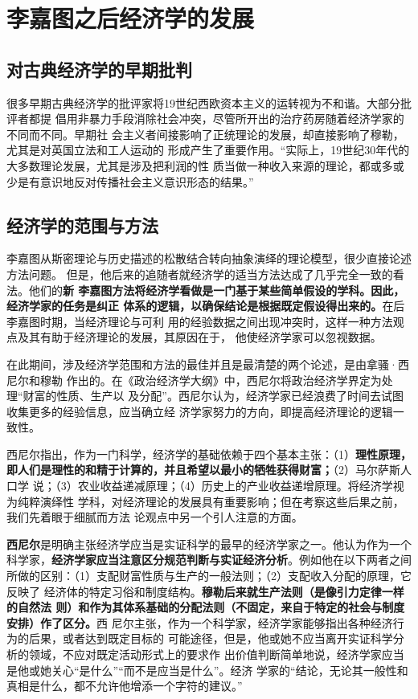 \section{李嘉图之后经济学的发展}

\subsection{对古典经济学的早期批判}

很多早期古典经济学的批评家将19世纪西欧资本主义的运转视为不和谐。大部分批评者都提
倡用非暴力手段消除社会冲突，尽管所开出的治疗药房随着经济学家的不同而不同。早期社
会主义者间接影响了正统理论的发展，却直接影响了穆勒，尤其是对英国立法和工人运动的
形成产生了重要作用。“实际上，19世纪30年代的大多数理论发展，尤其是涉及把利润的性
质当做一种收入来源的理论，都或多或少是有意识地反对传播社会主义意识形态的结果。”

\subsection{经济学的范围与方法}

李嘉图从斯密理论与历史描述的松散结合转向抽象演绎的理论模型，很少直接论述方法问题。
但是，他后来的追随者就经济学的适当方法达成了几乎完全一致的看法。他们的\textbf{新
  李嘉图方法将经济学看做是一门基于某些简单假设的学科。因此，经济学家的任务是纠正
  体系的逻辑，以确保结论是根据既定假设得出来的。}在后李嘉图时期，当经济理论与可利
用的经验数据之间出现冲突时，这样一种方法观点及其有助于经济理论的发展，其原因在于，
他使经济学家可以忽视数据。

在此期间，涉及经济学范围和方法的最佳并且是最清楚的两个论述，是由拿骚·西尼尔和穆勒
作出的。在《政治经济学大纲》中，西尼尔将政治经济学界定为处理“财富的性质、生产以
及分配”。西尼尔认为，经济学家已经浪费了时间去试图收集更多的经验信息，应当确立经
济学家努力的方向，即提高经济理论的逻辑一致性。

西尼尔指出，作为一门科学，经济学的基础依赖于四个基本主张：（1）\textbf{理性原理，
  即人们是理性的和精于计算的，并且希望以最小的牺牲获得财富；}（2）马尔萨斯人口学
说；（3）农业收益递减原理；（4）历史上的产业收益递增原理。将经济学视为纯粹演绎性
学科，对经济理论的发展具有重要影响；但在考察这些后果之前，我们先着眼于细腻而方法
论观点中另一个引人注意的方面。

\textbf{西尼尔}是明确主张经济学应当是实证科学的最早的经济学家之一。他认为作为一个
科学家，\textbf{经济学家应当注意区分规范判断与实证经济分析}。例如他在以下两者之间
所做的区别：（1）支配财富性质与生产的一般法则；（2）支配收入分配的原理，它反映了
经济体的特定习俗和制度结构。\textbf{穆勒后来就生产法则（是像引力定律一样的自然法
  则）和作为其体系基础的分配法则（不固定，来自于特定的社会与制度安排）作了区分。}西
尼尔主张，作为一个科学家，经济学家能够指出各种经济行为的后果，或者达到既定目标的
可能途径，但是，他或她不应当离开实证科学分析的领域，不应对既定活动形式上的要求作
出价值判断简单地说，经济学家应当是他或她关心“是什么”“而不是应当是什么”。经济
学家的“结论，无论其一般性和真相是什么，都不允许他增添一个字符的建议。”


